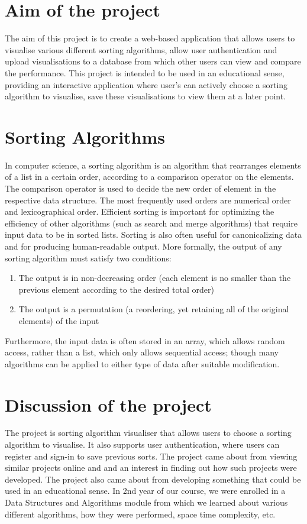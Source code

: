 \section{Aim of the project}
The aim of this project is to create a web-based application that allows users to
visualise various different sorting algorithms, allow user authentication and 
upload visualisations to a database from which other users can view and compare
the performance. This project is intended to be used in an educational sense,
providing an interactive application where user's can actively choose a sorting
algorithm to visualise, save these visualisations to view them at a later point.

\section{Sorting Algorithms}
In computer science, a sorting algorithm is an algorithm that rearranges 
elements of a list in a certain order, according to a comparison operator on the
elements. The comparison operator is used to decide the new order of element in the respective data structure. The most frequently used orders are numerical order and lexicographical order. Efficient sorting is important for optimizing the efficiency of other algorithms (such as search and merge algorithms) that require input data to be in sorted lists. Sorting is also often useful for canonicalizing data and for producing human-readable output. More formally, the output of any sorting algorithm must satisfy two conditions:

\begin{enumerate}
    \item The output is in non-decreasing order (each element is no smaller than 
    the previous element according to the desired total order)
    \item The output is a permutation (a reordering, yet retaining all of the 
    original elements) of the input
\end{enumerate}

Furthermore, the input data is often stored in an array, which allows random 
access, rather than a list, which only allows sequential access; though many 
algorithms can be applied to either type of data after suitable modification.

\section{Discussion of the project}
The project is sorting algorithm visualiser that allows users to choose a sorting
algorithm to visualise. It also supports user authentication, where users can 
register and sign-in to save previous sorts. The project came about from viewing 
similar projects online and and an interest in finding out how such projects were
developed. The project also came about from developing something that could be 
used in an educational sense. In 2nd year of our course, we were enrolled in a 
Data Structures and Algorithms module from which we learned about various 
different algorithms, how they were performed, space time complexity, etc.

